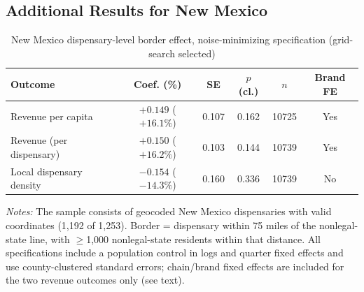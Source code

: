 \documentclass[english,12pt]{article}
\begin{document}
\subsection{Additional Results for New Mexico}
\label{app:nm}

\begin{table}[htbp]
\centering
\caption{New Mexico dispensary-level border effect, noise-minimizing specification (grid-search selected)}
\label{tab:nm_dispensary_border_best}
\footnotesize
\begin{tabular}{lccccc}
\toprule
Outcome & Coef. (\%) & SE & $p$ (cl.) & $n$ & Brand FE \\
\midrule
Revenue per capita & $+0.149$ ($+16.1\%$) & 0.107 & 0.162 & 10725 & Yes \\
Revenue (per dispensary) & $+0.150$ ($+16.2\%$) & 0.103 & 0.144 & 10739 & Yes \\
Local dispensary density & $-0.154$ ($-14.3\%$) & 0.160 & 0.336 & 10739 & No \\
\bottomrule
\end{tabular}
\begin{minipage}{0.98\textwidth}
\vspace{0.3em}
\footnotesize
\textit{Notes:} The sample consists of geocoded New Mexico dispensaries with valid coordinates (1,192 of 1,253). Border =
dispensary within 75 miles of the nonlegal-state line, with $\geq$1,000 nonlegal-state residents within that
distance. All specifications include a population control in logs and quarter fixed effects and use county-clustered standard errors;
chain/brand fixed effects are included for the two revenue outcomes only (see text).
\end{minipage}
\end{table}
\end{document}
